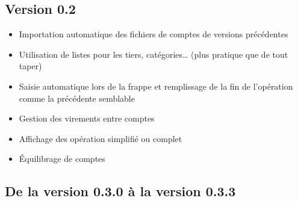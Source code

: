 \subsection{Version 0.2}

\begin{itemize}
	\item Importation automatique des fichiers de comptes de versions précédentes
	\item Utilisation de listes pour les tiers, catégories\dots{} (plus pratique que de tout taper)
	\item Saisie automatique lors de la frappe et remplissage de la fin de l'opération comme la précédente semblable
	\item Gestion des virements entre comptes
	\item Affichage des opération simplifié ou complet
	\item Équilibrage de comptes
\end{itemize}

\subsection{De la version 0.3.0 à la version 0.3.3}

